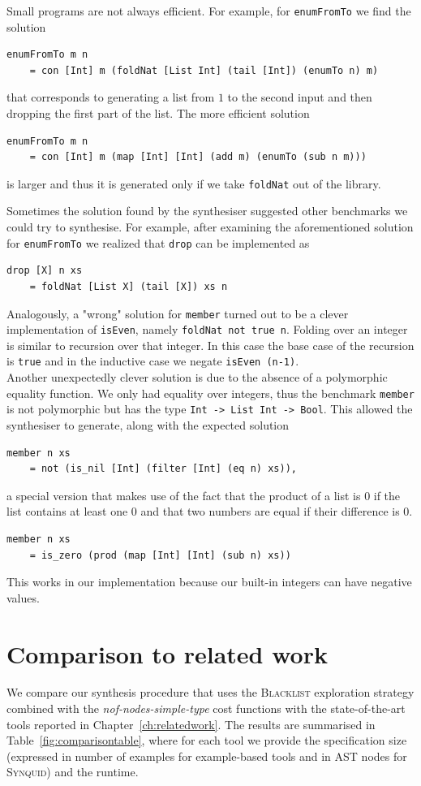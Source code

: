 Small programs are not always efficient. For example, for \lstinline?enumFromTo? we find the solution
\begin{lstlisting}
enumFromTo m n
    = con [Int] m (foldNat [List Int] (tail [Int]) (enumTo n) m)
\end{lstlisting}
that corresponds to generating a list from $1$ to the second input and then dropping the first part of the list. The more efficient solution
\begin{lstlisting}
enumFromTo m n
    = con [Int] m (map [Int] [Int] (add m) (enumTo (sub n m)))
\end{lstlisting}
is larger and thus it is generated only if we take \lstinline?foldNat? out of the library.

Sometimes the solution found by the synthesiser suggested other benchmarks we could try to synthesise. For example, after examining the aforementioned solution for \lstinline?enumFromTo? we realized that \lstinline?drop? can be implemented as
\begin{lstlisting}
drop [X] n xs
    = foldNat [List X] (tail [X]) xs n
\end{lstlisting}
Analogously, a "wrong" solution for \lstinline?member? turned out to be a clever implementation of \lstinline?isEven?, namely \lstinline?foldNat not true n?. Folding over an integer is similar to recursion over that integer. In this case the base case of the recursion is \lstinline?true? and in the inductive case we negate \lstinline?isEven (n-1)?.\\
Another unexpectedly clever solution is due to the absence of a polymorphic equality function. We only had equality over integers, thus the benchmark \lstinline?member? is not polymorphic but has the type \lstinline?Int -> List Int -> Bool?. This allowed the synthesiser to generate, along with the expected solution
\begin{lstlisting}
member n xs
    = not (is_nil [Int] (filter [Int] (eq n) xs)),
\end{lstlisting}
a special version that makes use of the fact that the product of a list is $0$ if the list contains at least one $0$ and that two numbers are equal if their difference is $0$.
\begin{lstlisting}
member n xs
    = is_zero (prod (map [Int] [Int] (sub n) xs))
\end{lstlisting}
This works in our implementation because our built-in integers can have negative values.


\section{Comparison to related work}
We compare our synthesis procedure that uses the \textsc{Blacklist} exploration strategy combined with the \textit{nof-nodes-simple-type} cost functions with the state-of-the-art tools reported in Chapter~\ref{ch:relatedwork}. The results are summarised in Table~\ref{fig:comparisontable}, where for each tool we provide the specification size (expressed in number of examples for example-based tools and in AST nodes for \textsc{Synquid}) and the runtime.

